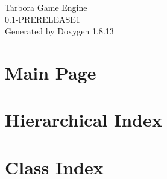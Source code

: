 \documentclass[twoside]{book}
\newcommand{\+}{\discretionary{\mbox{\scriptsize$\hookleftarrow$}}{}{}}
\newcommand{\clearemptydoublepage}{%
  \newpage{\pagestyle{empty}\cleardoublepage}%
}
\begin{document}
\hypersetup{pageanchor=false,
             bookmarksnumbered=true,
             pdfencoding=unicode
            }
\begin{titlepage}
\vspace*{7cm}
\begin{center}%
{\Large Tarbora Game Engine \\[1ex]\large 0.\+1-\/\+P\+R\+E\+R\+E\+L\+E\+A\+S\+E1 }\\
\vspace*{1cm}
{\large Generated by Doxygen 1.8.13}\\
\end{center}
\end{titlepage}
\clearemptydoublepage
{}
\tableofcontents
\clearemptydoublepage
{}
\hypersetup{pageanchor=true}

\chapter{Main Page}
\label{index}\hypertarget{index}{}
\chapter{Hierarchical Index}

\chapter{Class Index}

\end{document}
